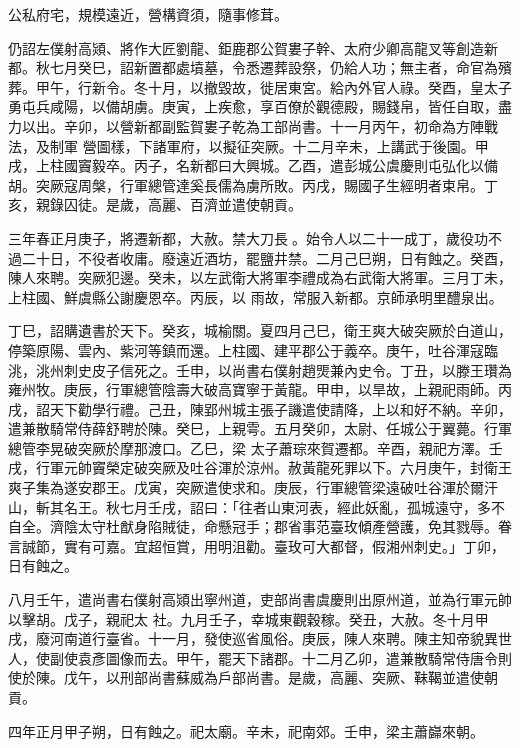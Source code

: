 \begin{pinyinscope}
 公私府宅，規模遠近，營構資須，隨事修茸。



 仍詔左僕射高熲、將作大匠劉龍、鉅鹿郡公賀婁子幹、太府少卿高龍叉等創造新都。秋七月癸巳，詔新置都處墳墓，令悉遷葬設祭，仍給人功；無主者，命官為殯葬。甲午，行新令。冬十月，以撤毀故，徙居東宮。給內外官人祿。癸酉，皇太子勇屯兵咸陽，以備胡虜。庚寅，上疾愈，享百僚於觀德殿，賜錢帛，皆任自取，盡力以出。辛卯，以營新都副監賀婁子乾為工部尚書。十一月丙午，初命為方陣戰法，及制軍
 營圖樣，下諸軍府，以擬征突厥。十二月辛未，上講武于後園。甲戌，上柱國竇毅卒。丙子，名新都曰大興城。乙酉，遣彭城公虞慶則屯弘化以備胡。突厥寇周槃，行軍總管達奚長儒為虜所敗。丙戌，賜國子生經明者束帛。丁亥，親錄囚徒。是歲，高麗、百濟並遣使朝貢。



 三年春正月庚子，將遷新都，大赦。禁大刀長。始令人以二十一成丁，歲役功不過二十日，不役者收庸。廢遠近酒坊，罷鹽井禁。二月己巳朔，日有蝕之。癸酉，陳人來聘。突厥犯邊。癸未，以左武衛大將軍李禮成為右武衛大將軍。三月丁未，上柱國、鮮虞縣公謝慶恩卒。丙辰，以
 雨故，常服入新都。京師承明里醴泉出。



 丁巳，詔購遺書於天下。癸亥，城榆關。夏四月己巳，衛王爽大破突厥於白道山，停築原陽、雲內、紫河等鎮而還。上柱國、建平郡公于義卒。庚午，吐谷渾寇臨洮，洮州刺史皮子信死之。壬申，以尚書右僕射趙煚兼內史令。丁丑，以滕王瓚為雍州牧。庚辰，行軍總管陰壽大破高寶寧于黃龍。甲申，以旱故，上親祀雨師。丙戌，詔天下勸學行禮。己丑，陳郢州城主張子譏遣使請降，上以和好不納。辛卯，遣兼散騎常侍薛舒聘於陳。癸巳，上親雩。五月癸卯，太尉、任城公于翼薨。行軍總管李晃破突厥於摩那渡口。乙巳，梁
 太子蕭琮來賀遷都。辛酉，親祀方澤。壬戌，行軍元帥竇榮定破突厥及吐谷渾於涼州。赦黃龍死罪以下。六月庚午，封衛王爽子集為遂安郡王。戊寅，突厥遣使求和。庚辰，行軍總管梁遠破吐谷渾於爾汗山，斬其名王。秋七月壬戌，詔曰：「往者山東河表，經此妖亂，孤城遠守，多不自全。濟陰太守杜猷身陷賊徒，命懸冠手；郡省事范臺玫傾產營護，免其戮辱。眷言誠節，實有可嘉。宜超恒賞，用明沮勸。臺玫可大都督，假湘州刺史。」丁卯，日有蝕之。



 八月壬午，遣尚書右僕射高熲出寧州道，吏部尚書虞慶則出原州道，並為行軍元帥以擊胡。戊子，親祀太
 社。九月壬子，幸城東觀穀稼。癸丑，大赦。冬十月甲戌，廢河南道行臺省。十一月，發使巡省風俗。庚辰，陳人來聘。陳主知帝貌異世人，使副使袁彥圖像而去。甲午，罷天下諸郡。十二月乙卯，遣兼散騎常侍唐令則使於陳。戊午，以刑部尚書蘇威為戶部尚書。是歲，高麗、突厥、靺鞨並遣使朝貢。



 四年正月甲子朔，日有蝕之。祀太廟。辛未，祀南郊。壬申，梁主蕭巋來朝。




\end{pinyinscope}
